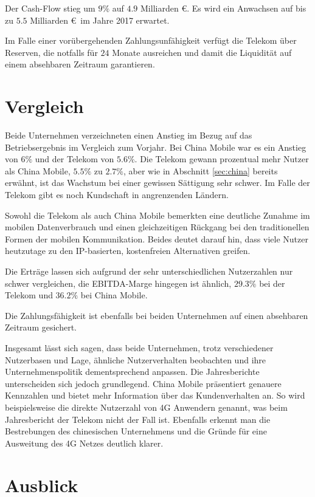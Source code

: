 Der Cash-Flow stieg um $9\%$ auf $4.9$ Milliarden \euro. Es wird ein Anwachsen auf bis zu $5.5$ Milliarden \euro \ im Jahre 2017 erwartet. 

Im Falle einer vorübergehenden Zahlungsunfähigkeit verfügt die Telekom über Reserven, die notfalls für $24$ Monate ausreichen und damit die Liquidität auf einem absehbaren Zeitraum garantieren.    

\section{Vergleich}
\label{sec:vergleich}

Beide Unternehmen verzeichneten einen Anstieg im Bezug auf das Betriebsergebnis im Vergleich zum Vorjahr. Bei China Mobile war es ein Anstieg von $6\%$ und der Telekom von $5.6\%$. Die Telekom gewann prozentual mehr Nutzer als China Mobile, $5.5\%$ zu $2.7\%$, aber wie in Abschnitt \ref{sec:china} bereits erwähnt, ist das Wachstum bei einer gewissen Sättigung sehr schwer. Im Falle der Telekom gibt es noch Kundschaft in angrenzenden Ländern.

Sowohl die Telekom als auch China Mobile bemerkten eine deutliche Zunahme im mobilen Datenverbrauch und einen gleichzeitigen Rückgang bei den traditionellen Formen der mobilen Kommunikation. Beides deutet darauf hin, dass viele Nutzer heutzutage zu den IP-basierten, kostenfreien Alternativen greifen.

Die Erträge lassen sich aufgrund der sehr unterschiedlichen Nutzerzahlen nur schwer vergleichen, die EBITDA-Marge hingegen ist ähnlich, $29.3\%$ bei der Telekom und $36.2\%$ bei China Mobile. 

Die Zahlungsfähigkeit ist ebenfalls bei beiden Unternehmen auf einen absehbaren Zeitraum gesichert.  

Insgesamt lässt sich sagen, dass beide Unternehmen, trotz verschiedener Nutzerbasen und Lage, ähnliche Nutzerverhalten beobachten und ihre Unternehmenspolitik dementsprechend anpassen. Die Jahresberichte unterscheiden sich jedoch grundlegend. China Mobile präsentiert genauere Kennzahlen und bietet mehr Information über das Kundenverhalten an. So wird beispielsweise die direkte Nutzerzahl von 4G Anwendern genannt, was beim Jahresbericht der Telekom nicht der Fall ist. Ebenfalls erkennt man die Bestrebungen des chinesischen Unternehmens und die Gründe für eine Ausweitung des 4G Netzes deutlich klarer.  

\section{Ausblick}


